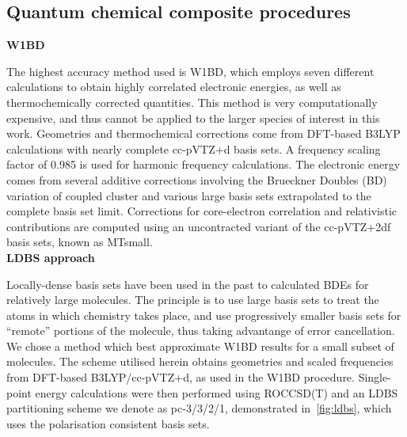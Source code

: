 \subsection{Quantum chemical composite procedures}

\noindent \textbf{W1BD}

The highest accuracy method used is W1BD, which employs seven different calculations to obtain highly correlated electronic energies, as well as thermochemically corrected quantities. This method is very computationally expensive, and thus cannot be applied to the larger species of interest in this work. Geometries and thermochemical corrections come from DFT-based B3LYP calculations with nearly complete cc-pVTZ+d basis sets. A frequency scaling factor of 0.985 is used for harmonic frequency calculations. The electronic energy comes from several additive corrections involving the Brueckner Doubles\cite{Barnes2009} (BD) variation of coupled cluster and various large basis sets extrapolated to the complete basis set limit. Corrections for core-electron correlation and relativistic contributions are computed using an uncontracted variant of the cc-pVTZ+2df basis sets, known as MTsmall.\cite{Martin1999}
\\

\noindent \textbf{LDBS approach}

Locally-dense basis sets have been used in the past to calculated BDEs for relatively large molecules.\cite{DiLabio1999LDBS, Wright2001} The principle is to use large basis sets to treat the atoms in which chemistry takes place, and use progressively smaller basis sets for ``remote'' portions of the molecule, thus taking advantange of error cancellation. We chose a method which best approximate W1BD results for a small subset of molecules. The scheme utilised herein obtains geometries and scaled frequencies from DFT-based B3LYP/cc-pVTZ+d, as used in the W1BD procedure. Single-point energy calculations were then performed using ROCCSD(T) and an LDBS partitioning scheme we denote as pc-3/3/2/1, demonstrated in~\ref{fig:ldbs}, which uses the polarisation consistent basis sets.\cite{Jensen2001}

